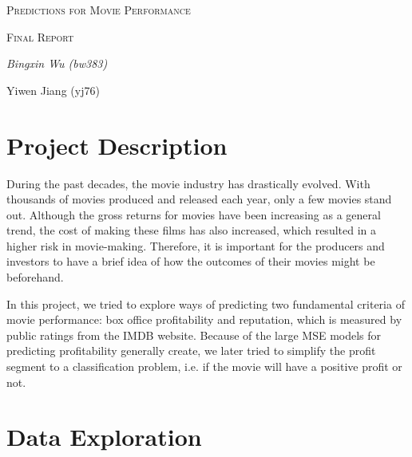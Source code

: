 \documentclass[12pt]{article}
\begin{document}
\begin{titlepage}
    \vspace*{5.7cm}
    \begin{center}
    {\scshape\huge Predictions for Movie Performance \par}
    \vspace{1cm}
    {\scshape\huge Final Report \par}
    \vspace{1.5cm}
    {\itshape\large Bingxin Wu (bw383) \par \bigskip Yiwen Jiang (yj76) }
    \vspace{1cm}

    \end{center}
\end{titlepage}

\clearpage

\setcounter{page}{1}
{\small\tableofcontents}
\newpage

\setcounter{page}{1}
\section{Project Description}
During the past decades, the movie industry has drastically evolved. With thousands of movies produced and released each year, only a few movies stand out. Although the gross returns for movies have been increasing as a general trend, the cost of making these films has also increased, which resulted in a higher risk in movie-making. Therefore, it is important for the producers and investors to have a brief idea of how the outcomes of their movies might be beforehand. \par
	In this project, we tried to explore ways of predicting two fundamental criteria of movie performance: box office profitability and reputation, which is measured by public ratings from the IMDB website. Because of the large MSE models for predicting profitability generally create, we later tried to simplify the profit segment to a classification problem, i.e. if the movie will have a positive profit or not. 

\section{Data Exploration}
\end{document}
